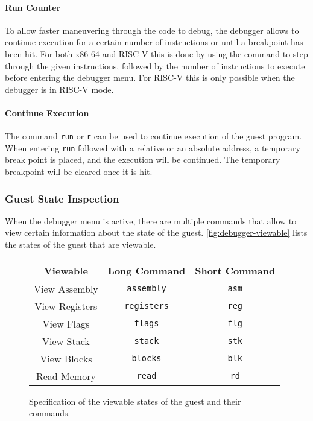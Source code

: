 	\paragraph{Run Counter}
		To allow faster maneuvering through the code to debug, the debugger allows to continue execution for a certain number of instructions or until a breakpoint has been hit. For both x86-64 and RISC-V this is done by using the command to step through the given instructions, followed by the number of instructions to execute before entering the debugger menu. For RISC-V this is only possible when the debugger is in RISC-V mode.
	
	\paragraph{Continue Execution}
		The command \texttt{run} or \texttt{r} can be used to continue execution of the guest program. When entering \texttt{run} followed with a relative or an absolute address, a temporary break point is placed, and the execution will be continued. The temporary breakpoint will be cleared once it is hit.
	
	\subsubsection{Guest State Inspection}
		When the debugger menu is active, there are multiple commands that allow to view certain information about the state of the guest. \autoref{fig:debugger-viewable} lists the states of the guest that are viewable.
		\begin{figure}[H]
			\centering
			\begin{tabular}{|c|c|c|}
				\hline 
				\textbf{Viewable} & \textbf{Long Command} & \textbf{Short Command} \\
				\hline
				View Assembly & \texttt{assembly} & \texttt{asm} \\ 
				\hline 
				View Registers & \texttt{registers} & \texttt{reg} \\ 
				\hline 
				View Flags & \texttt{flags} & \texttt{flg} \\ 
				\hline 
				View Stack & \texttt{stack} & \texttt{stk} \\ 
				\hline 
				View Blocks & \texttt{blocks} & \texttt{blk} \\ 
				\hline 
				Read Memory & \texttt{read} & \texttt{rd} \\ 
				\hline 
			\end{tabular}
		\caption[Debugger Viewable States]{Specification of the viewable states of the guest and their commands.}
		\label{fig:debugger-viewable}
		\end{figure}
		 
